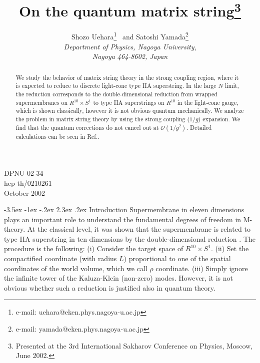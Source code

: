 \documentclass[a4paper,12pt]{article}
\makeatletter
\renewcommand\section{\@startsection {section}{1}{\z@}%
		{-3.5ex \@plus -1ex \@minus -.2ex}%
		{2.3ex \@plus.2ex}%
		{\normalfont\large\bfseries}}
\makeatother
\begin{document}
\title{On the quantum matrix string\footnote{
Presented at the 3rd International Sakharov Conference on Physics,
 Moscow, June 2002.} }

\author{{\sc Shozo Uehara}\footnote{e-mail:
 uehara@eken.phys.nagoya-u.ac.jp}~ and {\sc Satoshi
 Yamada}\footnote{e-mail: yamada@eken.phys.nagoya-u.ac.jp}
\vspace{4mm}\\
{\sl Department of Physics, Nagoya University},\\
{\sl Nagoya 464-8602, Japan}}
\date{}

\maketitle
\vspace{-75mm}
\begin{flushright}
DPNU-02-34\\
hep-th/0210261\\
October 2002
\end{flushright}
\vspace{50mm}
%
\begin{abstract}
We study the behavior of matrix string theory in the strong coupling
region, where it is expected to reduce to discrete light-cone type
IIA superstring.
In the large $N$ limit, the reduction corresponds to the
double-dimensional reduction from wrapped supermembranes on $R^{10}
\times S^1$ to type IIA superstrings on $R^{10}$ in the light-cone
gauge, which is shown classically, however it is not obvious quantum
mechanically.
We analyze the problem in matrix string theory by using the strong
coupling ($1/g$) expansion.
We find that the quantum corrections do not cancel out
at $\mathcal{O}(1/g^2)$.
Detailed calculations can be seen in Ref.\cite{UY}.
\end{abstract}

\section{Introduction}
Supermembrane in eleven dimensions \cite{HLP,BST} plays an important
role to understand the fundamental degrees of freedom in M-theory.
At the classical level, it was shown that the supermembrane
is related to type IIA superstring in ten dimensions by the
double-dimensional reduction \cite{DHIS}.
The procedure is the following: (i) Consider the target space of
$R^{10}\times S^1$. (ii) Set the compactified coordinate (with radius
$L$) proportional to one of the spatial coordinates of the world volume,
which we call $\rho$ coordinate. (iii) Simply ignore the infinite
tower of the Kaluza-Klein (non-zero) modes.
However, it is not obvious whether such a reduction is justified
also in quantum theory.
\end{document}

